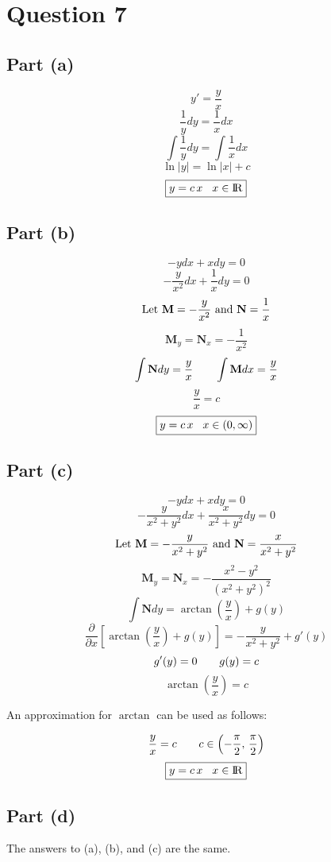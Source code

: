 \documentclass{article}
\begin{document}
\section*{Question 7}
\subsection*{Part (a)}
\[y'=\frac{y}{x}\]
\[\frac{1}{y}dy=\frac{1}{x}dx\]
\[\int\frac{1}{y}dy=\int\frac{1}{x}dx\]
\[\ln|y|=\ln|x|+c\]
\[\boxed{y=c\,x\hspace{3 mm}x\in{\rm I\!R}}\]
\subsection*{Part (b)}
\[-ydx+xdy=0\]
\[-\frac{y}{x^2}dx+\frac{1}{x}dy=0\]
\[\textnormal{Let } \textbf{M}=-\frac{y}{x^2} \textnormal{ and } \textbf{N}=\frac{1}{x}\]
\[\textbf{M}_y=\textbf{N}_x=-\frac{1}{x^2}\]
\[\int\textbf{N}dy=\frac{y}{x}\hspace{7 mm}\int\textbf{M}dx=\frac{y}{x}\]
\[\frac{y}{x}=c\]
\[\boxed{y=c\,x\hspace{3 mm}x\in(0,\infty)}\]
\subsection*{Part (c)}
\[-ydx+xdy=0\]
\[-\frac{y}{x^2+y^2}dx+\frac{x}{x^2+y^2}dy=0\]
\[\textnormal{Let } \textbf{M}=-\frac{y}{x^2+y^2} \textnormal{ and } \textbf{N}=\frac{x}{x^2+y^2}\]
\[\textbf{M}_y=\textbf{N}_x=-\frac{x^2-y^2}{(x^2+y^2)^2}\]
\[\int\textbf{N}dy=\arctan\left(\frac{y}{x}\right)+g(y)\]
\[\frac{\partial}{\partial x}\left[\arctan\left(\frac{y}{x}\right)+g(y)\right]=-\frac{y}{x^2+y^2}+g'(y)\]
\[g'(y)=0\hspace{7 mm}g(y)=c\]
\[\arctan\left(\frac{y}{x}\right)=c\]
\begin{center}
An approximation for \(\arctan\) can be used as follows:
\end{center}
\[\frac{y}{x}=c\hspace{7 mm}c\in\left(-\frac{\pi}{2},\,\frac{\pi}{2}\right)\]
\[\boxed{y=c\,x\hspace{3 mm}x\in{\rm I\!R}}\]
\subsection*{Part (d)}
The answers to (a), (b), and (c) are the same.
\end{document}
